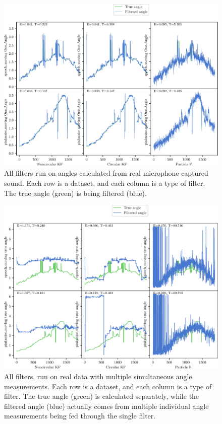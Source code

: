 \documentclass[11pt]{amsart}
\begin{document}
\begin{figure}[htp]
    \centering
    \includegraphics[width=.95\textwidth]{actual_paper_graphs/all_real.pdf}\hfill
    \caption{All filters run on angles calculated from real microphone-captured sound. Each row is a dataset, and each column is a type of filter. The true angle (green) is being filtered (blue).}
    \label{fig:all_real}
\end{figure}

\begin{figure}[htp]
    \centering
    \includegraphics[width=.95\textwidth]{actual_paper_graphs/multiple_angles.pdf}\hfill
    \caption{All filters, run on real data with multiple simultaneous angle measurements. Each row is a dataset, and each column is a type of filter. The true angle (green) is calculated separately, while the filtered angle (blue) actually comes from multiple individual angle measurements being fed through the single filter.}
    \label{fig:multiple_angles}
\end{figure}
\end{document}

